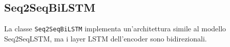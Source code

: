 
\subsection{Seq2SeqBiLSTM}
La classe \texttt{Seq2SeqBiLSTM} implementa un'architettura simile al modello Seq2SeqLSTM, ma i layer LSTM dell'encoder sono bidirezionali.

